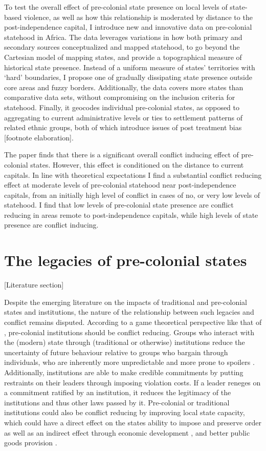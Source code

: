 \documentclass[12pt]{article}
\begin{document}
To test the overall effect of pre-colonial state presence on local levels of
state-based violence, as well as how this relationship is moderated by distance
to the post-independence capital, I introduce new and innovative data on
pre-colonial statehood in Africa. The data leverages variations in how both
primary and secondary sources conceptualized and mapped statehood, to go beyond
the Cartesian model of mapping states, and provide a topographical measure of
historical state presence. Instead of a uniform measure of states' territories
with `hard' boundaries, I propose one of gradually dissipating state presence
outside core areas and fuzzy borders. Additionally, the data covers more states
than comparative data sets, without compromising on the inclusion criteria for
statehood. Finally, it geocodes individual pre-colonial states, as opposed to
aggregating to current administrative levels or ties to settlement patterns of
related ethnic groups, both of which introduce issues of post treatment bias
[footnote elaboration]. 

The paper finds that there is a significant overall conflict inducing effect of
pre-colonial states. However, this effect is conditioned on the distance to
current capitals. In line with theoretical expectations I find a substantial
conflict reducing effect at moderate levels of pre-colonial statehood near
post-independence capitals, from an initially high level of conflict in cases of
no, or very low levels of statehood. I find that low levels of pre-colonial
state presence are conflict reducing in areas remote to post-independence
capitals, while high levels of state presence are conflict inducing. 

\section{The legacies of pre-colonial states} 
\label{The legacies of pre-colonial states}

[Literature section]

Despite the emerging literature on the impacts of traditional and pre-colonial
states and institutions, the nature of the relationship between such legacies
and conflict remains disputed. According to a game theoretical perspective like
that of \citet{Fearon1995}, pre-colonial institutions should be
conflict reducing. Groups who interact with the (modern) state through
(traditional or otherwise) institutions reduce the uncertainty of future
behaviour relative to groups who bargain through individuals, who are inherently
more unpredictable and more prone to spoilers \citep{Wig2016}. Additionally,
institutions are able to make credible commitments by putting restraints on
their leaders through imposing violation costs. If a leader reneges on a
commitment ratified by an institution, it reduces the legitimacy of the
institutions and thus other laws passed by it. Pre-colonial or traditional
institutions could also be conflict reducing by improving local state capacity,
which could have a direct effect on the states ability to impose and preserve
order as well as an indirect effect through economic development
\citep{Depetris-Chauvin2016}, and better public goods provision
\citep{Wilfahrt_2021}. 
\end{document}
